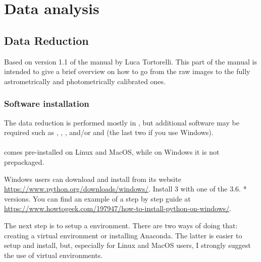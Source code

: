 \documentclass[a4paper, 11pt, fleqn]{memoir}
\begin{document}
\part{Data analysis}

\chapter{Data Reduction}

Based on version 1.1 of the manual by Luca Tortorelli\autocite{Tortorelli2015_DataReduction}.
This part of the manual is intended to give a brief overview on how to go from the raw images to the fully astrometrically and photometrically calibrated ones.

\section{Software installation}

The data reduction is performed mostly in , but additional software may be required such as , , ,  and/or  and  (the last two if you use Windows).

\subsection{}

 comes pre-installed on Linux and MacOS, while on Windows it is not prepackaged.

Windows users can download and install  from its website \url{https://www.python.org/downloads/windows/}.
Install  3 with one of the 3.6.
* versions.
You can find an example of a step by step guide at \url{https://www.howtogeek.com/197947/how-to-install-python-on-windows/}.

The next step is to setup a  environment.
There are two ways of doing that: creating a virtual environment or installing Anaconda.
The latter is easier to setup and install, but, especially for Linux and MacOS users, I strongly suggest the use of virtual environments.
\end{document}
